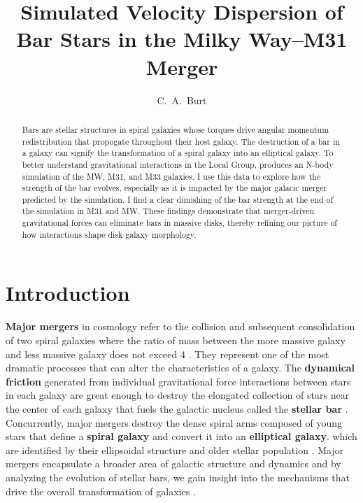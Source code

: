 \documentclass[twocolumn]{aastex631}
\begin{document}
\title{Simulated Velocity Dispersion of Bar Stars in the Milky Way–M31 Merger}

\author[0009-0008-2061-4946]{C.~A.~Burt}


\begin{abstract}

  Bars are stellar structures in spiral galaxies whose torques drive
  angular momentum redistribution that propogate throughout their host
  galaxy. The destruction of a bar in a galaxy can signify the
  transformation of a spiral galaxy into an elliptical galaxy. To
  better understand gravitational interactions in the Local Group,
  \citet{vandermarel:12} produces an N-body simulation of the MW, M31,
  and M33 galaxies. I use this data to explore how the strength of the
  bar evolves, especially as it is impacted by the major galacic
  merger predicted by the simulation. I find a clear dimishing of the
  bar strength at the end of the simulation in M31 and MW. These
  findings demonstrate that merger-driven gravitational forces can
  eliminate bars in massive disks, thereby refining our picture of how
  interactions shape disk galaxy morphology.

\end{abstract}

\section{Introduction}

\textbf{Major mergers} in cosmology refer to the collision and
subsequent consolidation of two spiral galaxies where the ratio of
mass between the more massive galaxy and less massive galaxy does not
exceed 4 \citep{wetzel:16}. They represent one of the most dramatic
processes that can alter the characteristics of a galaxy. The
\textbf{dynamical friction} generated from individual gravitational
force interactions between stars in each galaxy are great enough to
destroy the elongated collection of stars near the center of each
galaxy that fuels the galactic nucleus called the \textbf{stellar bar}
\citep[e.g.,][]{knapen:02}. Concurrently, major mergers destroy the
dense spiral arms composed of young stars that define a \textbf{spiral
  galaxy} and convert it into an \textbf{elliptical galaxy}. which are
identified by their ellipsoidal structure and older stellar population
\citep{hubble:36}. Major mergers encapsulate a broader area of
galactic structure and dynamics and by analyzing the evolution of
stellar bars, we gain insight into the mechanisms that drive the
overall transformation of galaxies \citep[e.g.,][]{vandermarel:01}.
\end{document}
